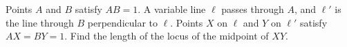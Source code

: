 Points $A$ and $B$ satisfy $AB=1$. A variable line $\ell$ passes through $A$, and $\ell'$ is the line through $B$ perpendicular to $\ell$. Points $X$ on $\ell$ and $Y$ on $\ell'$ satisfy $AX=BY=1$. Find the length of the locus of the midpoint of $XY$.
